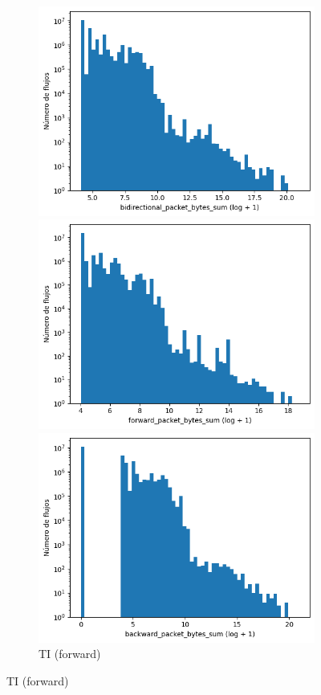 \begin{figure}[H]
\begin{subfigure}[b]{0.26\textwidth}
        \includegraphics[width=\linewidth]{media/packet_pincer_toniot/bidirectional_packet_bytes_sum_log_x_log_y.png}
        \caption{TI (bidir.)}
        \includegraphics[width=\textwidth]{media/packet_pincer_toniot/forward_packet_bytes_sum_log_x_log_y.png}
        \caption{TI (forward)}
        \includegraphics[width=\textwidth]{media/packet_pincer_toniot/backward_packet_bytes_sum_log_x_log_y.png}

\end{subfigure}
\end{figure}
